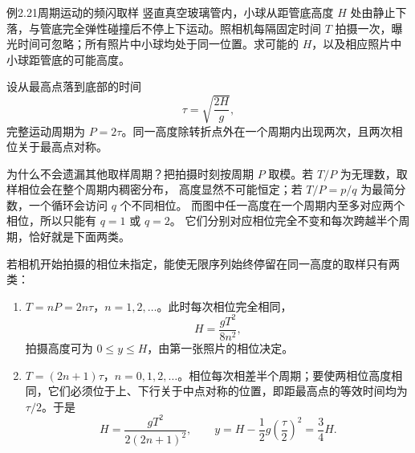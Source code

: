 \begin{origexamplebox}{例2.21\quad 周期运动的频闪取样}
竖直真空玻璃管内，小球从距管底高度 $H$ 处由静止下落，与管底完全弹性碰撞后不停上下运动。照相机每隔固定时间 $T$ 拍摄一次，曝光时间可忽略；所有照片中小球均处于同一位置。求可能的 $H$，以及相应照片中小球距管底的可能高度。
\end{origexamplebox}
\begin{xesolution}
设从最高点落到底部的时间
\[
\tau=\sqrt{\frac{2H}{g}},
\]
完整运动周期为 $P=2\tau$。同一高度除转折点外在一个周期内出现两次，且两次相位关于最高点对称。

\begin{center}
\end{center}

为什么不会遗漏其他取样周期？把拍摄时刻按周期 $P$ 取模。若 $T/P$ 为无理数，取样相位会在整个周期内稠密分布，
高度显然不可能恒定；若 $T/P=p/q$ 为最简分数，一个循环会访问 $q$ 个不同相位。
而图中任一高度在一个周期内至多对应两个相位，所以只能有 $q=1$ 或 $q=2$。
它们分别对应相位完全不变和每次跨越半个周期，恰好就是下面两类。

若相机开始拍摄的相位未指定，能使无限序列始终停留在同一高度的取样只有两类：
\begin{enumerate}
  \item $T=nP=2n\tau$，$n=1,2,\ldots$。此时每次相位完全相同，
  \[
    \boxed{H=\frac{gT^2}{8n^2}},
  \]
  拍摄高度可为 $0\le y\le H$，由第一张照片的相位决定。
  \item $T=(2n+1)\tau$，$n=0,1,2,\ldots$。相位每次相差半个周期；要使两相位高度相同，它们必须位于上、下行关于中点对称的位置，即距最高点的等效时间均为 $\tau/2$。于是
  \[
    \boxed{H=\frac{gT^2}{2(2n+1)^2}},\qquad
    \boxed{y=H-\frac12g\left(\frac{\tau}{2}\right)^2=\frac34H}.
  \]
\end{enumerate}


\end{xesolution}
